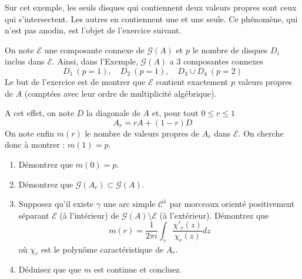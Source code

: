 Sur cet exemple, les seuls disques qui contiennent deux valeurs propres sont
ceux qui s'intersectent. Les autres en contiennent une et une seule. Ce
phénomène, qui n'est pas anodin, est l'objet de l'exercice suivant.

\begin{exercice}
\label{ex:gersh} On note $\mathcal E$ une composante connexe de $\mathcal
G(A)$ et $p$ le nombre de disques $D_i$ inclus dans $\mathcal E$. Ainsi, dans
l'Exemple, $\mathcal G(A)$ a 3 composantes connexes
\[
D_1 \ (p = 1),\quad D_2 \ (p = 1), \quad D_3 \cup D_4 \ (p= 2)
\]
Le but de l'exercice est de montrer que $\mathcal E$ contient exactement $p$
valeurs propres de $A$ (comptées avec leur ordre de multiplicité algébrique). 

A cet effet, on note $D$ la diagonale de $A$ et, pour tout $0 \leq r \leq 1$
\[
A_r = rA + (1-r)D
\]
On note enfin $m(r)$ le nombre de valeurs propres de $A_r$ dans $\mathcal E$.
On cherche donc à montrer : $m(1) = p$.
\begin{enumerate}
\item Démontrez que $m(0) = p$.
\item Démontrez que $\mathcal G(A_r) \subset \mathcal G(A)$.
\item {Supposez qu'il existe} $\gamma$ une arc simple $\mathcal C^1$ par
	morceaux orienté positivement séparant $\mathcal E$ (à l'intérieur) de
	$\mathcal G(A) \setminus \mathcal E$ (à l'extérieur). Démontrez que
\[
	m(r) = \frac1{2\pi i}\int_{\gamma} \frac{\chi'_{r}(z)}{\chi_{r}(z)}dz
\]
où $\chi_{r}$ est le polynôme caractéristique de $A_r$.
\item Déduisez que que $m$ est continue et concluez.
\end{enumerate}
\end{exercice}
